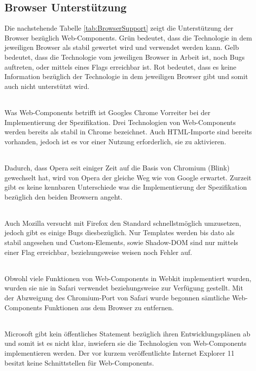 \subsection{Browser Unterstützung}
\label{sec:3_WC_Support}

Die nachstehende Tabelle \ref{tab:BrowserSupport} zeigt die Unterstützung der Browser bezüglich Web-Components. Grün bedeutet, dass die Technologie in dem jeweiligen Browser als stabil gewertet wird und verwendet werden kann. Gelb bedeutet, dass die Technologie vom jeweiligen Browser in Arbeit ist, noch Bugs auftreten, oder mittels eines Flags erreichbar ist. Rot bedeutet, dass es keine Information bezüglich der Technologie in dem jeweiligen Browser gibt und somit auch nicht unterstützt wird.

\begin{description}
 \hfill \\
Was Web-Components betrifft ist Googles Chrome Vorreiter bei der Implementierung der Spezifikation. Drei Technologien von Web-Components werden bereits als stabil in Chrome bezeichnet. Auch HTML-Importe sind bereits vorhanden, jedoch ist es vor einer Nutzung erforderlich, sie zu aktivieren.

 \hfill \\
Dadurch, dass Opera seit einiger Zeit auf die Basis von Chromium (Blink) gewechselt hat, wird von Opera der gleiche Weg wie von Google erwartet. Zurzeit gibt es keine kennbaren Unterschiede was die Implementierung der Spezifikation bezüglich den beiden Browsern angeht.

 \hfill \\
Auch Mozilla versucht mit Firefox den Standard schnellstmöglich umzusetzen, jedoch gibt es einige Bugs diesbezüglich. Nur Templates werden bis dato als stabil angesehen und Custom-Elements, sowie Shadow-DOM sind nur mittels einer Flag erreichbar, beziehungsweise weisen noch Fehler auf.

 \hfill \\
Obwohl viele Funktionen von Web-Components in Webkit implementiert wurden, wurden sie nie in Safari verwendet beziehungsweise zur Verfügung gestellt. Mit der Abzweigung des Chromium-Port von Safari wurde begonnen sämtliche Web-Components Funktionen aus dem Browser zu entfernen.

 \hfill \\
Microsoft gibt kein öffentliches Statement bezüglich ihren Entwicklungsplänen ab und somit ist es nicht klar, inwiefern sie die Technologien von Web-Components implementieren werden. Der vor kurzem veröffentlichte Internet Explorer 11 besitzt keine Schnittstellen für Web-Components.

\end{description}

